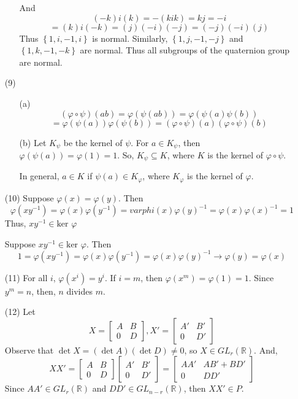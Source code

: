 \begin{itemize}
\begin{itemize}
And
$$(-k)i(k) = -(kik) = kj = -i$$
$$= (k)i(-k) = (j)(-i)(-j) = (-j)(-i)(j)$$
Thus $\left\lbrace 1, i, -1, i \right\rbrace$ is normal. Similarly, $\left\lbrace 1, j, -1, -j \right\rbrace$ and $\left\lbrace 1, k , -1, -k \right\rbrace$ are normal. Thus all subgroups of the quaternion group are normal.
\end{itemize}
\item[(9)]
\begin{itemize}
\item[(a)]
$$(\varphi \circ \psi)(ab) = \varphi(\psi(ab)) = \varphi(\psi(a)\psi(b))$$
$$= \varphi(\psi(a))\varphi(\psi(b)) = (\varphi \circ \psi)(a)(\varphi \circ \psi)(b)$$
\item[(b)]
Let $K_\psi$ be the kernel of $\psi$. For $a \in K_\psi$, then $\varphi(\psi(a)) = \varphi(1) = 1$. So, $K_\psi \subseteq K$, where $K$ is the kernel of $\varphi \circ \psi$. 

In general, $a \in K$ if $\psi(a) \in K_\varphi$, where $K_\varphi$ is the kernel of $\varphi$. 
\end{itemize}
\item[(10)]
Suppose $\varphi(x) = \varphi(y)$. Then 
$$\varphi(xy^{-1}) = \varphi(x)\varphi(y^{-1}) = varphi(x)\varphi(y)^{-1} = \varphi(x)\varphi(x)^{-1} = 1$$
Thus, $xy^{-1} \in \text{ker }\varphi$

Suppose $xy^{-1} \in \text{ker }\varphi$. Then
$$1 = \varphi(xy^{-1}) = \varphi(x)\varphi(y^{-1}) = \varphi(x)\varphi(y)^{-1} \rightarrow \varphi(y) = \varphi(x)$$
\item[(11)]
For all $i$, $\varphi(x^i) = y^i$. If $i = m$, then $\varphi(x^m) = \varphi(1) = 1$. Since $y^m = n$, then, $n$ divides $m$.
\item[(12)]
Let
$$X = \begin{bmatrix}
A & B \\
0 & D
\end{bmatrix}, X' = \begin{bmatrix}
A' & B' \\
0 & D'
\end{bmatrix}$$
Observe that $\det X = (\det A)(\det D) \neq 0$, so $X \in GL_r(\mathbb{R})$. And,
$$XX' = \begin{bmatrix}
A & B \\
0 & D
\end{bmatrix}\begin{bmatrix}
A' & B' \\
0 & D'
\end{bmatrix} = \begin{bmatrix}
AA' & AB' + BD' \\
0 & DD'
\end{bmatrix}$$
Since $AA' \in GL_r(\mathbb{R})$ and $DD' \in GL_{n-r}(\mathbb{R})$, then $XX' \in P$.


\end{itemize}
